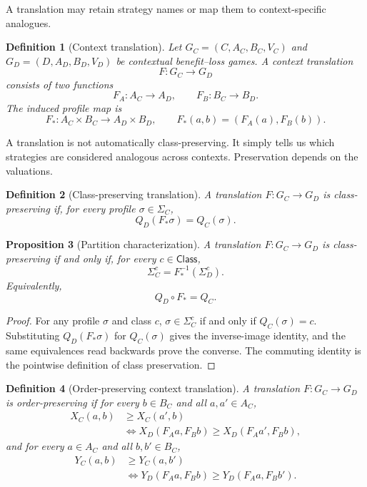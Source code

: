 \documentclass[a4paper,fleqn]{cas-dc}
\newtheorem{definition}{Definition}[section]
\newtheorem{proposition}[definition]{Proposition}
\theoremstyle{remark}
\newcommand{\Class}{\mathsf{Class}}
\newcommand{\Prof}{\Sigma}
\begin{document}
A translation may retain strategy names or map them to context-specific
analogues.

\begin{definition}[Context translation]
Let $G_C=(C,A_C,B_C,V_C)$ and $G_D=(D,A_D,B_D,V_D)$ be contextual benefit--loss games. A context translation
\[
F:G_C\longrightarrow G_D
\]
consists of two functions
\[
F_A:A_C\to A_D,\qquad F_B:B_C\to B_D.
\]
The induced profile map is
\[
F_*:A_C\times B_C\longrightarrow A_D\times B_D,\qquad F_*(a,b)=(F_A(a),F_B(b)).
\]
\end{definition}

A translation is not automatically class-preserving. It simply tells us which strategies are considered analogous across contexts. Preservation depends on the valuations.

\begin{definition}[Class-preserving translation]
A translation $F:G_C\to G_D$ is class-preserving if, for every profile $\sigma\in\Prof_C$,
\[
Q_D(F_*\sigma)=Q_C(\sigma).
\]
\end{definition}

\begin{proposition}[Partition characterization]
\label{thm:partition-preservation}
A translation $F:G_C\to G_D$ is class-preserving if and only if, for every $c\in\Class$,
\[
\Prof_C^c=F_*^{-1}(\Prof_D^c).
\]
Equivalently,
\[
Q_D\circ F_*=Q_C.
\]
\end{proposition}

\begin{proof}
For any profile $\sigma$ and class $c$,
$\sigma\in\Prof_C^c$ if and only if $Q_C(\sigma)=c$.  Substituting
$Q_D(F_*\sigma)$ for $Q_C(\sigma)$ gives the inverse-image identity,
and the same equivalences read backwards prove the converse.  The commuting
identity is the pointwise definition of class preservation.
\end{proof}

\begin{definition}[Order-preserving context translation]
A translation $F:G_C\to G_D$ is order-preserving if for every $b\in B_C$ and all $a,a'\in A_C$,
\[
\begin{aligned}
X_C(a,b)&\ge X_C(a',b)\\
&\Longleftrightarrow X_D(F_Aa,F_Bb)\ge X_D(F_Aa',F_Bb),
\end{aligned}
\]
and for every $a\in A_C$ and all $b,b'\in B_C$,
\[
\begin{aligned}
Y_C(a,b)&\ge Y_C(a,b')\\
&\Longleftrightarrow Y_D(F_Aa,F_Bb)\ge Y_D(F_Aa,F_Bb').
\end{aligned}
\]
\end{definition}
\end{document}
